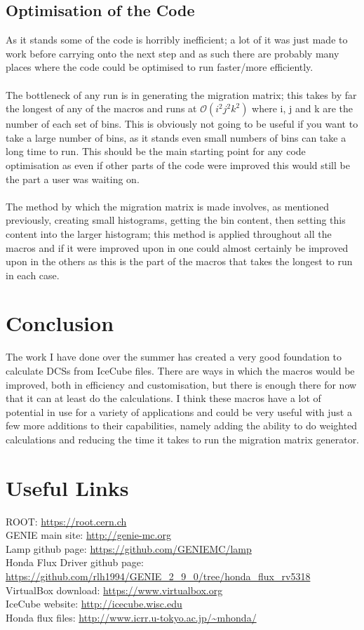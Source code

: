 \documentclass[12pt]{article}
\numberwithin{equation}{section}
\numberwithin{figure}{section}
\begin{document}
\subsection{Optimisation of the Code} %
\label{sub:optimisation_of_the_code}
As it stands some of the code is horribly inefficient; a lot of it was just made to work before carrying onto the next step and as such there are probably many places where the code could be optimised to run faster/more efficiently.\\
\\
The bottleneck of any run is in generating the migration matrix; this takes by far the longest of any of the macros and runs at $\mathcal{O}(i^2j^2k^2)$ where i, j and k are the number of each set of bins. This is obviously not going to be useful if you want to take a large number of bins, as it stands even small numbers of bins can take a long time to run. This should be the main starting point for any code optimisation as even if other parts of the code were improved this would still be the part a user was waiting on.\\
\\
The method by which the migration matrix is made involves, as mentioned previously, creating small histograms, getting the bin content, then setting this content into the larger histogram; this method is applied throughout all the macros and if it were improved upon in one could almost certainly be improved upon in the others as this is the part of the macros that takes the longest to run in each case.
%
%
\section{Conclusion} %
\label{sec:conclusion}
The work I have done over the summer has created a very good foundation to calculate DCSs from IceCube files. There are ways in which the macros would be improved, both in efficiency and customisation, but there is enough there for now that it can at least do the calculations. I think these macros have a lot of potential in use for a variety of applications and could be very useful with just a few more additions to their capabilities, namely adding the ability to do weighted calculations and reducing the time it takes to run the migration matrix generator.
%
\section{Useful Links} %
\label{sec:useful_links}
ROOT: \url{https://root.cern.ch}\\
GENIE main site: \url{http://genie-mc.org}\\
Lamp github page: \url{https://github.com/GENIEMC/lamp}\\
Honda Flux Driver github page: \url{https://github.com/rlh1994/GENIE_2_9_0/tree/honda_flux_rv5318}\\
VirtualBox download: \url{https://www.virtualbox.org}\\
IceCube website: \url{http://icecube.wisc.edu}\\
Honda flux files: \url{http://www.icrr.u-tokyo.ac.jp/~mhonda/}\\
\newpage
\appendix
\end{document}
